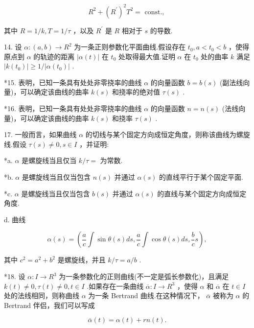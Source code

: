\[
{R}^{2} + {\left( {R}^{\prime }\right) }^{2}{T}^{2} = \text{ const., }
\]

其中 \(R = 1/k,T = 1/\tau\) ，以及 \({R}^{\prime }\) 是 \(R\) 相对于 \(s\) 的导数.

14. 设 \(\alpha  : \left( {a,b}\right)  \rightarrow  {R}^{2}\) 为一条正则参数化平面曲线.假设存在 \({t}_{0},a < {t}_{0} < b\) ，使得原点到 \(\alpha\) 的轨迹的距离 \(\left| {\alpha \left( t\right) }\right|\) 在 \({t}_{0}\) 处取得最大值.证明 \(\alpha\) 在 \({t}_{0}\) 处的曲率 \(k\) 满足 \(\left| {k\left( {t}_{0}\right) }\right|  \geq  1/\left| {\alpha \left( {t}_{0}\right) }\right|\) .

*15. 表明，已知一条具有处处非零挠率的曲线 \(\alpha\) 的向量函数 \(b = b\left( s\right)\) (副法线向量)，可以确定该曲线的曲率 \(k\left( s\right)\) 和挠率的绝对值 \(\tau \left( s\right)\) .

*16. 表明，已知一条具有处处非零挠率的曲线 \(\alpha\) 的向量函数 \(n = n\left( s\right)\) (法线向量)，可以确定该曲线的曲率 \(k\left( s\right)\) 和挠率 \(\tau \left( s\right)\) .

17. 一般而言，如果曲线 \(\alpha\) 的切线与某个固定方向成恒定角度，则称该曲线为螺旋线.假设 \(\tau \left( s\right)  \neq  0,s \in  I\) ，并证明:

*a. \(\alpha\) 是螺旋线当且仅当 \(k/\tau  =\) 为常数.

*b. \(\alpha\) 是螺旋线当且仅当包含 \(n\left( s\right)\) 并通过 \(\alpha \left( s\right)\) 的直线平行于某个固定平面.

*c. \(\alpha\) 是螺旋线当且仅当包含 \(b\left( s\right)\) 并通过 \(\alpha \left( s\right)\) 的直线与某个固定方向成恒定角度.

d. 曲线

\[
\alpha \left( s\right)  = \left( {\frac{a}{c}\int \sin \theta \left( s\right) {ds},\frac{a}{c}\int \cos \theta \left( s\right) {ds},\frac{b}{c}s}\right) ,
\]

其中 \({c}^{2} = {a}^{2} + {b}^{2}\) 是螺旋线，并且 \(k/\tau  = a/b\) .

*18. 设 \(\alpha  : I \rightarrow  {R}^{3}\) 为一条参数化的正则曲线(不一定是弧长参数化)，且满足 \(k\left( t\right)  \neq  0,\tau \left( t\right)  \neq  0,t \in  I\) .如果存在一条曲线 \(\overline{\alpha } : I \rightarrow  {R}^{3}\) ，使得 \(\alpha\) 和 \(\overline{\alpha }\) 在 \(t \in  I\) 处的法线相同，则称曲线 \(\alpha\) 为一条 Bertrand 曲线.在这种情况下， \(\overline{\alpha }\) 被称为 \(\alpha\) 的 Bertrand 伴侣，我们可以写成

\[
\overline{\alpha }\left( t\right)  = \alpha \left( t\right)  + {rn}\left( t\right) .
\]

